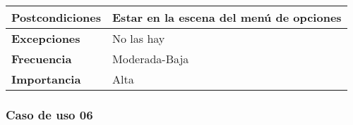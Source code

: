 \begin{tabularx}{\columnwidth}{l|l}
\begin{minipage}{0.25\columnwidth}
\textbf{Postcondiciones} 
\end{minipage}
&
\begin{minipage}{0.65\columnwidth}
Estar en la escena del menú de opciones
\end{minipage}
\\ \hline

\begin{minipage}{0.25\columnwidth}
\textbf{Excepciones} 
\end{minipage}
&
\begin{minipage}{0.65\columnwidth}
No las hay
\end{minipage}
\\ \hline

\begin{minipage}{0.25\columnwidth}
\textbf{Frecuencia} 
\end{minipage}
&
\begin{minipage}{0.65\columnwidth}
Moderada-Baja
\end{minipage}
\\ \hline

\begin{minipage}{0.25\columnwidth}
\textbf{Importancia} 
\end{minipage}
&
\begin{minipage}{0.65\columnwidth}
Alta
\end{minipage}
\\ \hline
\end{tabularx}

\subsubsection{Caso de uso 06}

